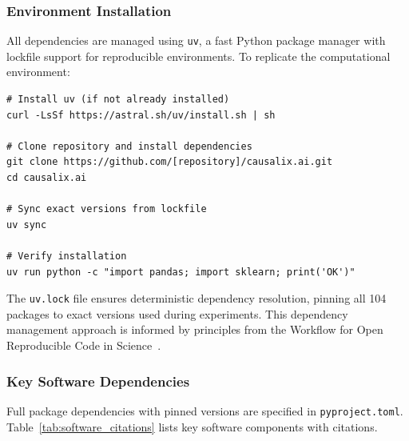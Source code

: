 \subsubsection{Environment Installation}

All dependencies are managed using \texttt{uv}, a fast Python package manager with lockfile support for reproducible environments. To replicate the computational environment:

\begin{verbatim}
# Install uv (if not already installed)
curl -LsSf https://astral.sh/uv/install.sh | sh

# Clone repository and install dependencies
git clone https://github.com/[repository]/causalix.ai.git
cd causalix.ai

# Sync exact versions from lockfile
uv sync

# Verify installation
uv run python -c "import pandas; import sklearn; print('OK')"
\end{verbatim}

\noindent The \texttt{uv.lock} file ensures deterministic dependency resolution, pinning all 104 packages to exact versions used during experiments. This dependency management approach is informed by principles from the Workflow for Open Reproducible Code in Science~\cite{vanlissa2021worcs}.

\subsubsection{Key Software Dependencies}

Full package dependencies with pinned versions are specified in \texttt{pyproject.toml}. Table~\ref{tab:software_citations} lists key software components with citations.

